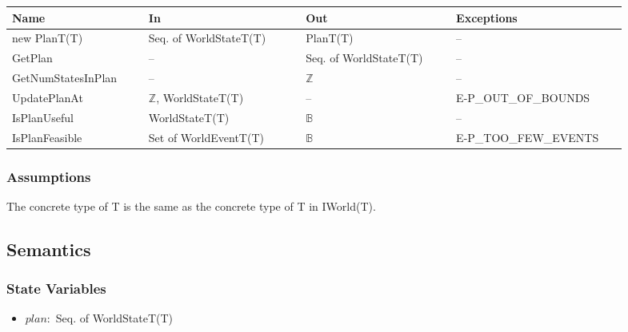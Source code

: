 \begin{center}
    \renewcommand{\arraystretch}{1.2}
    \begin{tabular}{m{0.2\linewidth} m{0.23\linewidth} m{0.22\linewidth}
    m{0.25\linewidth}}
        \toprule
        \textbf{Name} & \textbf{In} & \textbf{Out} & \textbf{Exceptions} \\
        \midrule

        \rowcolor[gray]{0.9}new PlanT(T) & Seq. of WorldStateT(T) & PlanT(T) &
        -- \\

        GetPlan & -- & Seq. of WorldStateT(T) & -- \\

        \rowcolor[gray]{0.9}GetNumStatesInPlan & -- & $\mathbb{Z}$ & -- \\

        UpdatePlanAt & $\mathbb{Z}$, WorldStateT(T) & -- & E-P\_OUT\_OF\_BOUNDS
        \\

        \rowcolor[gray]{0.9}IsPlanUseful & WorldStateT(T) & $\mathbb{B}$ & -- \\

        IsPlanFeasible & Set of WorldEventT(T) & $\mathbb{B}$ &
        E-P\_TOO\_FEW\_EVENTS \\

        \bottomrule
    \end{tabular}
\end{center}

\subsubsection{Assumptions}
The concrete type of T is the same as the concrete type of T in IWorld(T).

\subsection{Semantics}

\subsubsection{State Variables}

\begin{itemize}

    \item $\mathit{plan} : $ Seq. of WorldStateT(T)

\end{itemize}

